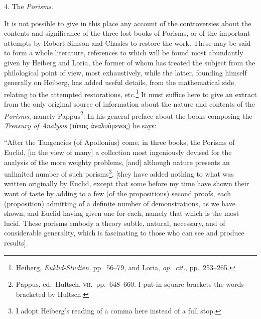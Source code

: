 4. The \emph{Porisms}.

It is not possible to give in this place any account of the controversies about the contents and significance of the three lost books of Porisms, or of the important attempts by Robert Simson and Chasles to restore the work. These may be said to form a whole literature, references to which will be found most abundantly given by Heiberg and Loria, the former of whom has treated the subject from the philological point of view, most exhaustively, while the latter, founding himself generally on Heiberg, has added useful details, from the mathematical side, relating to the attempted restorations, etc.\footnote{Heiberg, \emph{Euklid-Studien}, pp.~56--79, and Loria, \emph{op.~cit.}, pp.~253--265.} It must suffice here to give an extract from the only original source of information about the nature and contents of the \emph{Porisms}, namely Pappus\footnote{Pappus, ed.\ Hultsch, \textsc{vii}.\ pp.~648--660. I put in square brackets the words bracketed by Hultsch.}. In his general preface about the books composing the \emph{Treasury of Analysis} (τόπος ἀναλυόμενος) he says:

``After the Tangencies (of Apollonius) come, in three books, the Porisms of Euclid, [in the view of many] a collection most ingeniously devised for the analysis of the more weighty problems, [and] although nature presents an unlimited number of such porisms\footnote{I adopt Heiberg's reading of a comma here instead of a full stop.}, [they have added nothing to what was written originally by Euclid, except that some before my time have shown their want of taste by adding to a few (of the propositions) second proofs, each (proposition) admitting of a definite number of demonstrations, as we have shown, and Euclid having given one for each, namely that which is the most lucid. These porisms embody a theory subtle, natural, necessary, and of considerable generality, which is fascinating to those who can see and produce results].

